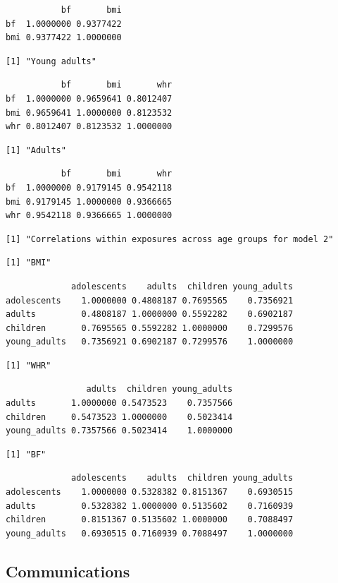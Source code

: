 \documentclass[11pt,twoside]{bristolthesis}
\begin{document}
\begin{verbatim}
           bf       bmi
bf  1.0000000 0.9377422
bmi 0.9377422 1.0000000
\end{verbatim}
\begin{verbatim}
[1] "Young adults"
\end{verbatim}
\begin{verbatim}
           bf       bmi       whr
bf  1.0000000 0.9659641 0.8012407
bmi 0.9659641 1.0000000 0.8123532
whr 0.8012407 0.8123532 1.0000000
\end{verbatim}
\begin{verbatim}
[1] "Adults"
\end{verbatim}
\begin{verbatim}
           bf       bmi       whr
bf  1.0000000 0.9179145 0.9542118
bmi 0.9179145 1.0000000 0.9366665
whr 0.9542118 0.9366665 1.0000000
\end{verbatim}
\begin{verbatim}
[1] "Correlations within exposures across age groups for model 2"
\end{verbatim}
\begin{verbatim}
[1] "BMI"
\end{verbatim}
\begin{verbatim}
             adolescents    adults  children young_adults
adolescents    1.0000000 0.4808187 0.7695565    0.7356921
adults         0.4808187 1.0000000 0.5592282    0.6902187
children       0.7695565 0.5592282 1.0000000    0.7299576
young_adults   0.7356921 0.6902187 0.7299576    1.0000000
\end{verbatim}
\begin{verbatim}
[1] "WHR"
\end{verbatim}
\begin{verbatim}
                adults  children young_adults
adults       1.0000000 0.5473523    0.7357566
children     0.5473523 1.0000000    0.5023414
young_adults 0.7357566 0.5023414    1.0000000
\end{verbatim}
\begin{verbatim}
[1] "BF"
\end{verbatim}
\begin{verbatim}
             adolescents    adults  children young_adults
adolescents    1.0000000 0.5328382 0.8151367    0.6930515
adults         0.5328382 1.0000000 0.5135602    0.7160939
children       0.8151367 0.5135602 1.0000000    0.7088497
young_adults   0.6930515 0.7160939 0.7088497    1.0000000
\end{verbatim}
\hypertarget{chapter4-appendix-communications}{%
\subsection{Communications}\label{chapter4-appendix-communications}}
\end{document}
